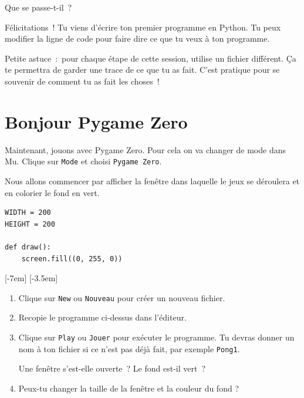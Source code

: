 \documentclass[11pt]{article}
\begin{document}
Que se passe-t-il~?

Félicitations~! Tu viens d'écrire ton premier programme en Python.
Tu peux modifier la ligne de code pour faire dire ce que tu veux à ton programme.

\begin{framed}
Petite astuce~:~pour chaque étape de cette session, utilise un fichier différent.
Ça te permettra de garder une trace de ce que tu as fait.
C'est pratique pour se souvenir de comment tu as fait les choses~!
\end{framed}

\section{Bonjour Pygame Zero}

Maintenant, jouons avec Pygame Zero. Pour cela on va changer de mode dans Mu. Clique sur \texttt{Mode} et choisi \texttt{Pygame Zero}.

Nous allons commencer par afficher la fenêtre dans laquelle le jeux se déroulera et en colorier le fond en vert.

\begin{lstlisting}
WIDTH = 200
HEIGHT = 200

def draw():
    screen.fill((0, 255, 0))
\end{lstlisting}
\marginnote{\textcolor{deepblue}{WIDTH~=~largeur\\HEIGHT~=~hauteur}}[-7em]
\marginnote{\textcolor{deepblue}{draw~=~dessiner\\screen~=~écran\\fill~=~remplir}}[-3.5em]

\begin{enumerate}
    \item Clique sur \texttt{New} ou \texttt{Nouveau} pour créer un nouveau fichier.

    \item Recopie le programme ci-dessus dans l'éditeur.
    
    \item Clique sur \texttt{Play} ou \texttt{Jouer} pour exécuter le programme. Tu devras donner un nom à ton fichier si ce n'est pas déjà fait, par exemple \texttt{Pong1}.

          Une fenêtre s'est-elle ouverte~?
          Le fond est-il vert~?

    \item Peux-tu changer la taille de la fenêtre et la couleur du fond ?
\end{enumerate}
\end{document}
